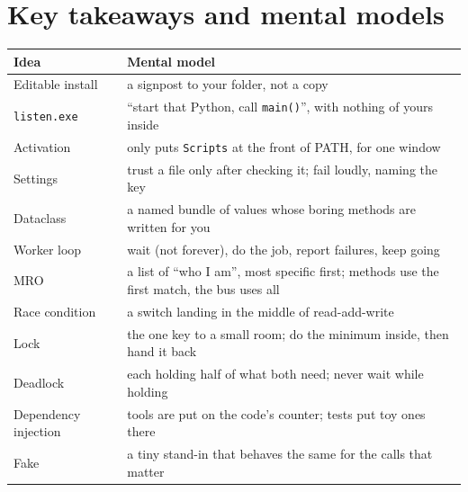 \documentclass[11pt,a4paper]{article}
\begin{document}
\section{Key takeaways and mental models}
\begin{center}
\renewcommand{\arraystretch}{1.2}
\begin{tabularx}{\textwidth}{l X}
\toprule
\textbf{Idea} & \textbf{Mental model} \\
\midrule
Editable install & a signpost to your folder, not a copy \\
\texttt{listen.exe} & ``start that Python, call \texttt{main()}'', with nothing of yours inside \\
Activation & only puts \texttt{Scripts} at the front of PATH, for one window \\
Settings & trust a file only after checking it; fail loudly, naming the key \\
Dataclass & a named bundle of values whose boring methods are written for you \\
Worker loop & wait (not forever), do the job, report failures, keep going \\
MRO & a list of ``who I am'', most specific first; methods use the first match, the bus uses all \\
Race condition & a switch landing in the middle of read-add-write \\
Lock & the one key to a small room; do the minimum inside, then hand it back \\
Deadlock & each holding half of what both need; never wait while holding \\
Dependency injection & tools are put on the code's counter; tests put toy ones there \\
Fake & a tiny stand-in that behaves the same for the calls that matter \\
\bottomrule
\end{tabularx}
\end{center}

\end{document}
